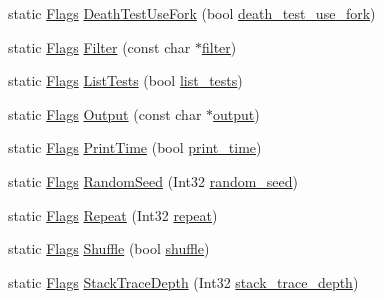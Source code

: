 \begin{DoxyCompactItemize}
\item 
static \mbox{\hyperlink{structtesting_1_1_flags}{Flags}} \mbox{\hyperlink{structtesting_1_1_flags_a4468e5625833043596c44be174349d8c}{Death\+Test\+Use\+Fork}} (bool \mbox{\hyperlink{structtesting_1_1_flags_a7cdef4e6e102771fc15940931dd07e5c}{death\+\_\+test\+\_\+use\+\_\+fork}})
\item 
static \mbox{\hyperlink{structtesting_1_1_flags}{Flags}} \mbox{\hyperlink{structtesting_1_1_flags_afc7350b7c1ac4c0e0efe2d9a94729eb7}{Filter}} (const char $\ast$\mbox{\hyperlink{structtesting_1_1_flags_ae9ab05193291ed87627adaceef9d1279}{filter}})
\item 
static \mbox{\hyperlink{structtesting_1_1_flags}{Flags}} \mbox{\hyperlink{structtesting_1_1_flags_a825a5d763a31fe6c28f543990bd336df}{List\+Tests}} (bool \mbox{\hyperlink{structtesting_1_1_flags_a3c73f29131074146224018066379fb2f}{list\+\_\+tests}})
\item 
static \mbox{\hyperlink{structtesting_1_1_flags}{Flags}} \mbox{\hyperlink{structtesting_1_1_flags_a507916734a6d7ff2dd02891d7849f2d3}{Output}} (const char $\ast$\mbox{\hyperlink{structtesting_1_1_flags_ab8f863c8ba22841c9b1b48af7f01dfa7}{output}})
\item 
static \mbox{\hyperlink{structtesting_1_1_flags}{Flags}} \mbox{\hyperlink{structtesting_1_1_flags_af4dc8454995fb3691399a049e95de179}{Print\+Time}} (bool \mbox{\hyperlink{structtesting_1_1_flags_a8758d574ce5513402679df258f788733}{print\+\_\+time}})
\item 
static \mbox{\hyperlink{structtesting_1_1_flags}{Flags}} \mbox{\hyperlink{structtesting_1_1_flags_a695cd8b8ab44df5eaa371bacded78c05}{Random\+Seed}} (Int32 \mbox{\hyperlink{structtesting_1_1_flags_a4728bce63433f711205fd7b427e57f1b}{random\+\_\+seed}})
\item 
static \mbox{\hyperlink{structtesting_1_1_flags}{Flags}} \mbox{\hyperlink{structtesting_1_1_flags_a19d47e87d77a18ef4fa8a85b74e25956}{Repeat}} (Int32 \mbox{\hyperlink{structtesting_1_1_flags_a61614dd07f97f6e04d27c004ff15195e}{repeat}})
\item 
static \mbox{\hyperlink{structtesting_1_1_flags}{Flags}} \mbox{\hyperlink{structtesting_1_1_flags_a19ddbbaed61bda44a1940333b7c5a469}{Shuffle}} (bool \mbox{\hyperlink{structtesting_1_1_flags_a51c689e47e0f55c16116ac2a1d3b05d6}{shuffle}})
\item 
static \mbox{\hyperlink{structtesting_1_1_flags}{Flags}} \mbox{\hyperlink{structtesting_1_1_flags_a16b01d8bcceaa9fa8211fd24faa75b5a}{Stack\+Trace\+Depth}} (Int32 \mbox{\hyperlink{structtesting_1_1_flags_a20c6592453909c1adace64bf6a2bc2de}{stack\+\_\+trace\+\_\+depth}})

\end{DoxyCompactItemize}
